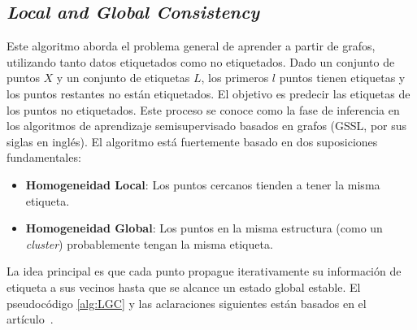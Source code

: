 \subsection{\textit{Local and Global Consistency}} \label{sec3:LGC}
Este algoritmo aborda el problema general de aprender a partir de grafos, utilizando tanto datos etiquetados como no etiquetados. Dado un conjunto de puntos $X$ y un conjunto de etiquetas $L$, los primeros $l$ puntos tienen etiquetas y los puntos restantes no están etiquetados. El objetivo es predecir las etiquetas de los puntos no etiquetados. Este proceso se conoce como la fase de inferencia en los algoritmos de aprendizaje semisupervisado basados en grafos (GSSL, por sus siglas en inglés). El algoritmo está fuertemente basado en dos suposiciones fundamentales: 
\begin{itemize}
	\item \textbf{Homogeneidad Local}: Los puntos cercanos tienden a tener la misma etiqueta.
	\item \textbf{Homogeneidad Global}: Los puntos en la misma estructura (como un \textit{cluster}) probablemente tengan la misma etiqueta.
\end{itemize}

La idea principal es que cada punto propague iterativamente su información de etiqueta a sus vecinos hasta que se alcance un estado global estable. El pseudocódigo \ref{alg:LGC} y las aclaraciones siguientes están basados en el artículo~\cite{LGC}.

